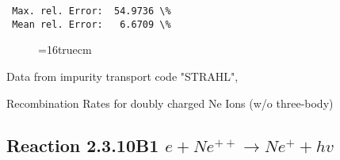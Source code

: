 \documentclass[12pt,dvipdfmx]{article}
\begin{document}
\begin{small}
\begin{verbatim}
 Max. rel. Error:  54.9736 \%
 Mean rel. Error:   6.6709 \%

\end{verbatim}\end{small}
\begin{figure} \label{2.3.10B0}
\epsfxsize=16truecm
\end{figure}
\newpage
Data from impurity transport code "STRAHL", \cite{kn:Behringer}

  Recombination Rates for doubly charged Ne Ions (w/o three-body)
\subsection{
Reaction 2.3.10B1   $e + Ne^{++}\rightarrow  Ne^+ + hv$
}
\end{document}
